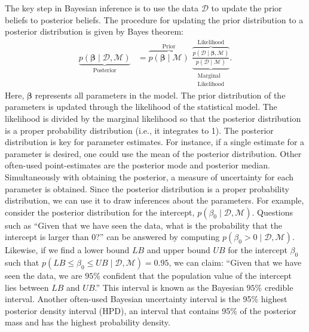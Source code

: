 \documentclass[a4paper]{article}
\newcommand{\prob}[1]{p\left(#1\right)}
\newcommand{\lik}[1]{p\left(#1\right)}
\newcommand{\data}{\mathcal{D}}
\newcommand{\model}{\mathcal{M}}
\begin{document}
The key step in Bayesian inference is to use the data $\data$ to update the prior beliefs to posterior beliefs.
The procedure for updating the prior distribution to a posterior distribution is given by Bayes theorem:
\begin{align*}\label{eq:BayesTheorem}
\underbrace{\prob{\bm{\beta} \mid \data , \model}}_{\text{Posterior}}
&=
\overbrace{\prob{\bm{\beta}\mid \model}}^{\text{Prior}}
\,\,
\underbrace{\overbrace{
		\frac{\lik{\data \mid \bm{\beta}, \model}}{\prob{\data \mid \model}}
	}^{\text{Likelihood}}}_{\substack{\text{Marginal}\\ \text{Likelihood}}}.
\end{align*}
Here, $\bm{\beta}$ represents all parameters in the model. The prior distribution of the parameters is updated through the likelihood of the statistical model. The likelihood is divided by the marginal likelihood so that the posterior distribution is a proper probability distribution (i.e., it integrates to 1). The posterior distribution is key for parameter estimates. For instance, if a single estimate for a parameter is desired, one could use the mean of the posterior distribution. Other often-used point-estimates are the posterior mode and posterior median. Simultaneously with obtaining the posterior, a measure of uncertainty for each parameter is obtained. Since the posterior distribution is a proper probability distribution, we can use it to draw inferences about the parameters. For example, consider the posterior distribution for the intercept, $\prob{\beta_0 \mid \data , \model}$. Questions such as ``Given that we have seen the data, what is the probability that the intercept is larger than 0?'' can be answered by computing $\prob{\beta_0 > 0 \mid \data , \model}$. Likewise, if we find a lower bound $LB$ and upper bound $UB$ for the intercept $\beta_0$ such that $\prob{ LB \leq \beta_0 \leq UB \mid \data , \model} = 0.95$, we can claim: ``Given that we have seen the data, we are $95\%$ confident that the population value of the intercept lies between $LB$ and $UB$.'' This interval is known as the Bayesian $95\%$ credible interval. Another often-used Bayesian uncertainty interval is the 95\% highest posterior density interval (HPD), an interval that contains 95\% of the posterior mass and has the highest probability density.
\end{document}
